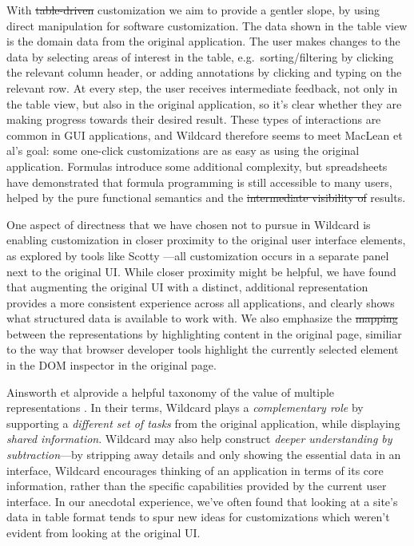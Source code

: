\documentclass[sigplan,screen,10pt,anonymous,review]{acmart}
\providecommand{\DIFadd}[1]{{\protect\color{blue}\uwave{#1}}} %
\providecommand{\DIFdel}[1]{{\protect\color{red}\sout{#1}}}                      %
\providecommand{\DIFaddbegin}{} %
\providecommand{\DIFaddend}{} %
\providecommand{\DIFdelbegin}{} %
\providecommand{\DIFdelend}{} %
\begin{document}
With \DIFdelbegin \DIFdel{table-driven }\DIFdelend \DIFaddbegin \DIFadd{data-driven }\DIFaddend customization we aim to provide a gentler slope, by
using direct manipulation for software customization. The data shown in
the table view is the domain data from the original application. The
user makes changes to the data by selecting areas of interest in the
table, e.g.~sorting/filtering by clicking the relevant column header, or
adding annotations by clicking and typing on the relevant row. At every
step, the user receives intermediate feedback, not only in the table
view, but also in the original application, so it's clear whether they
are making progress towards their desired result. These types of
interactions are common in GUI applications, and Wildcard therefore
seems to meet MacLean et al\DIFaddbegin \DIFadd{.}\DIFaddend 's goal: some one-click customizations are
as easy as using the original application. Formulas introduce some
additional complexity, but spreadsheets have demonstrated that formula
programming is still accessible to many users, helped by the pure
functional semantics and the \DIFdelbegin \DIFdel{intermediate visibility of }\DIFdelend \DIFaddbegin \DIFadd{visibility of intermediate }\DIFaddend results.

One aspect of directness that we have chosen not to pursue in Wildcard
is enabling customization in closer proximity to the original user
interface elements, as explored by tools like Scotty
\citep{eagan2011}---all customization occurs in a separate panel next to
the original UI. While closer proximity might be helpful, we have found
that augmenting the original UI with a distinct, additional
representation provides a more consistent experience across all
applications, and clearly shows what structured data is available to
work with. We also emphasize the \DIFdelbegin \DIFdel{mapping }\DIFdelend \DIFaddbegin \DIFadd{map ping }\DIFaddend between the representations by
highlighting content in the original page, similiar to the way that
browser developer tools highlight the currently selected element in the
DOM inspector in the original page.

Ainsworth et al\DIFaddbegin \DIFadd{.~}\DIFaddend provide a helpful taxonomy of the value of multiple
representations \citep{ainsworth1999}. In their terms, Wildcard plays a
\emph{complementary role} by supporting a \emph{different set of tasks}
from the original application, while displaying \emph{shared
information}. Wildcard may also help construct \emph{deeper
understanding by subtraction}---by stripping away details and only
showing the essential data in an interface, Wildcard encourages thinking
of an application in terms of its core information, rather than the
specific capabilities provided by the current user interface. In our
anecdotal experience, we've often found that looking at a site's data in
table format tends to spur new ideas for customizations which weren't
evident from looking at the original UI.
\end{document}
